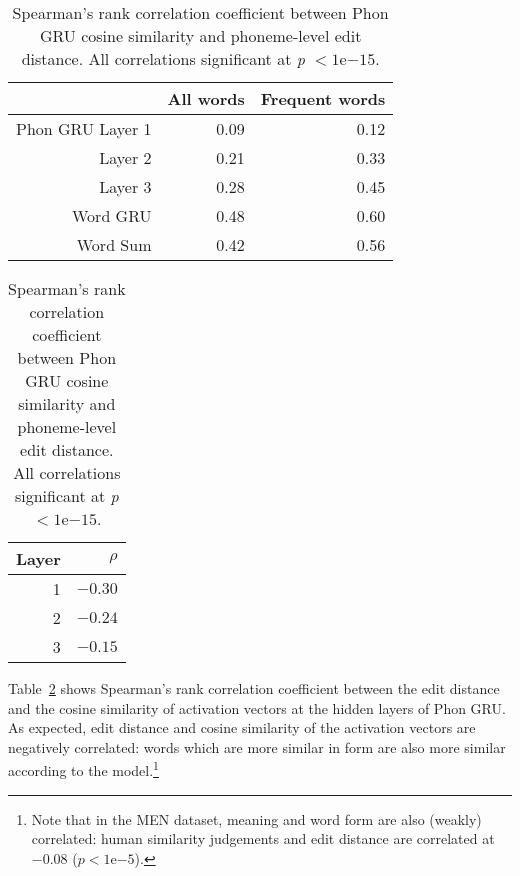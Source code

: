 \begin{table}[h]
  \begin{small}
    \begin{minipage}[l]{0.55\textwidth}
      \centering
      \begin{tabular}{rrr}
        & All words & Frequent words \\\hline
        {\sc Phon GRU} Layer 1 & 0.09 & 0.12\\
        Layer 2 & 0.21 & 0.33 \\
        Layer 3 & 0.28 & 0.45 \\
        \hline
        {\sc Word GRU} & 0.48 & 0.60\\	\hline
        {\sc Word Sum} & 0.42 & 0.56
      \end{tabular}
      \caption{Spearman's correlation coefficient between word-word
        cosine similarity and human similarity judgements. All
        correlations significant at \textit{p} $< 1\mathrm{e}{-4}$.
        Frequent words appear at least 100 times in the training
        data.}
      \label{tab:human}
    \end{minipage}
    \hspace{0.5cm}
    \begin{minipage}[r]{0.4\textwidth}
      \centering
      \begin{tabular}{rr}
        Layer   & $\rho$ \\\hline
        1 & $-0.30$ \\
        2 & $-0.24$ \\
        3 & $-0.15$
      \end{tabular}
      \caption{Spearman's rank correlation coefficient between {\sc
          Phon GRU} cosine similarity and phoneme-level edit
        distance. All correlations significant at \textit{p}
        $< 1\mathrm{e}{-15}$.}
      \label{tab:edit}
    \end{minipage}
  \end{small}

\end{table}

Table~\ref{tab:edit} shows Spearman's rank correlation coefficient between the edit distance and the cosine similarity of activation vectors at the hidden layers of {\sc Phon GRU}.
As expected, edit distance and cosine similarity of the activation vectors are negatively correlated: words which are more similar in form are also more similar according to the model.\footnote{Note that in the MEN dataset, meaning and word form are also (weakly) correlated: human similarity judgements and edit distance are correlated at $-0.08$ ($p< 1\mathrm{e}{-5}$).}

